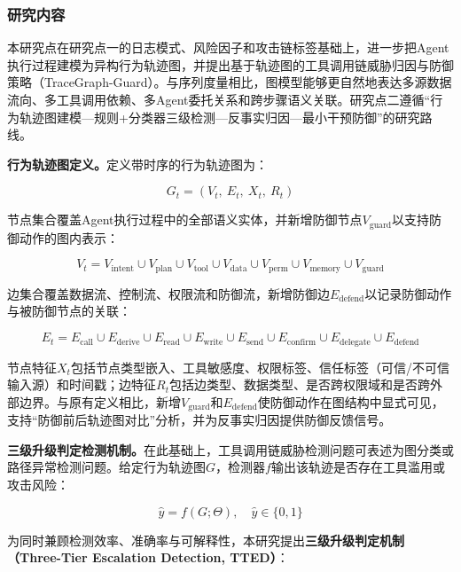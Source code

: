 \subsubsection{研究内容}

本研究点在研究点一的日志模式、风险因子和攻击链标签基础上，进一步把Agent执行过程建模为异构行为轨迹图，并提出基于轨迹图的工具调用链威胁归因与防御策略（TraceGraph-Guard）。与序列度量相比，图模型能够更自然地表达多源数据流向、多工具调用依赖、多Agent委托关系和跨步骤语义关联。研究点二遵循“行为轨迹图建模—规则+分类器三级检测—反事实归因—最小干预防御”的研究路线。

\textbf{行为轨迹图定义。}定义带时序的行为轨迹图为：

\begin{equation}
  G_t = (V_t,\ E_t,\ X_t,\ R_t)
\end{equation}

节点集合覆盖Agent执行过程中的全部语义实体，并新增防御节点$V_{\text{guard}}$以支持防御动作的图内表示：

\begin{equation}
  V_t = V_{\text{intent}} \cup V_{\text{plan}} \cup V_{\text{tool}} \cup V_{\text{data}} \cup V_{\text{perm}} \cup V_{\text{memory}} \cup V_{\text{guard}}
\end{equation}

边集合覆盖数据流、控制流、权限流和防御流，新增防御边$E_{\text{defend}}$以记录防御动作与被防御节点的关联：

\begin{equation}
  E_t = E_{\text{call}} \cup E_{\text{derive}} \cup E_{\text{read}} \cup E_{\text{write}} \cup E_{\text{send}} \cup E_{\text{confirm}} \cup E_{\text{delegate}} \cup E_{\text{defend}}
\end{equation}

节点特征$X_t$包括节点类型嵌入、工具敏感度、权限标签、信任标签（可信/不可信输入源）和时间戳；边特征$R_t$包括边类型、数据类型、是否跨权限域和是否跨外部边界。与原有定义相比，新增$V_{\text{guard}}$和$E_{\text{defend}}$使防御动作在图结构中显式可见，支持“防御前后轨迹图对比”分析，并为反事实归因提供防御反馈信号。

\textbf{三级升级判定检测机制。}在此基础上，工具调用链威胁检测问题可表述为图分类或路径异常检测问题。给定行为轨迹图$G$，检测器$f$输出该轨迹是否存在工具滥用或攻击风险：

\begin{equation}
  \hat{y} = f(G; \Theta), \quad \hat{y} \in \{0, 1\}
\end{equation}

为同时兼顾检测效率、准确率与可解释性，本研究提出\textbf{三级升级判定机制（Three-Tier Escalation Detection, TTED）}：

